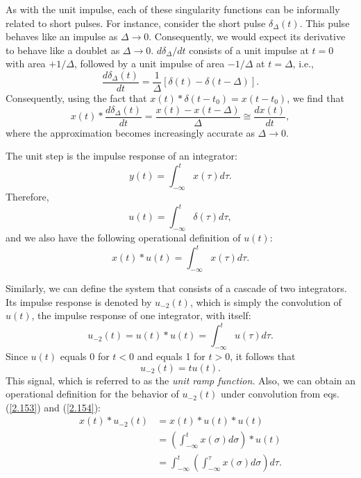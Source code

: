 \documentclass[a4paper,twoside]{book}
\begin{document}
As with the unit impulse, each of these singularity functions can be informally related to short pulses. For instance, consider the short pulse $\delta_\Delta(t)$. This pulse behaves like an impulse as $\Delta\to 0$. Consequently, we would expect its derivative to behave like a doublet as $\Delta\to 0$. $d\delta_\Delta/dt$ consists of a unit impulse at $t=0$ with area $+1/\Delta$, followed by a unit impulse of area $-1/\Delta$ at $t=\Delta$, i.e.,
\begin{equation}
    \frac{d\delta_\Delta(t)}{dt}=\frac1\Delta[\delta(t)-\delta(t-\Delta)].
    \label{2.150}
\end{equation}
Consequently, using the fact that $x(t)*\delta(t-t_0)=x(t-t_0)$, we find that
\begin{equation}
    x(t)*\frac{d\delta_\Delta(t)}{dt}=\frac{x(t)-x(t-\Delta)}\Delta\cong\frac{dx(t)}{dt},
    \label{2.151}
\end{equation}
where the approximation becomes increasingly accurate as $\Delta\to 0$.

The unit step is the impulse response of an integrator: $$y(t)=\int_{-\infty}^tx(\tau) d\tau.$$ Therefore,
\begin{equation}
    u(t)=\int_{-\infty}^t\delta(\tau) d\tau,
    \label{2.152}
\end{equation}
and we also have the following operational definition of $u(t)$:
\begin{equation}
    x(t)*u(t)=\int_{-\infty}^tx(\tau) d\tau.
    \label{2.153}
\end{equation}

Similarly, we can define the system that consists of a cascade of two integrators. Its impulse response is denoted by $u_{-2}(t)$, which is simply the convolution of $u(t)$, the impulse response of one integrator, with itself:
\begin{equation}
    u_{-2}(t) = u(t)*u(t) = \int_{-\infty}^{t}u(\tau) d\tau.
    \label{2.154}
\end{equation}
Since $u(t)$ equals 0 for $t<0$ and equals 1 for $t>0$, it follows that
\begin{equation}
    u_{-2}(t)=tu(t).
    \label{2.155}
\end{equation}
This signal, which is referred to as the \textit{unit ramp function}. Also, we can obtain an operational definition for the behavior of $u_{-2}(t)$ under convolution from eqs.\;(\ref{2.153}) and (\ref{2.154}):
\begin{equation}
    \begin{aligned}x(t)*u_{-2}(t)&= x(t)*u(t)*u(t)\\&=\left(\int_{-\infty}^{t}x(\sigma) d\sigma\right)*u(t)\\&=\int_{-\infty}^{t}\left(\int_{-\infty}^{\tau}x(\sigma) d\sigma\right)d\tau.\end{aligned}
    \label{2.156}
\end{equation}
\end{document}

